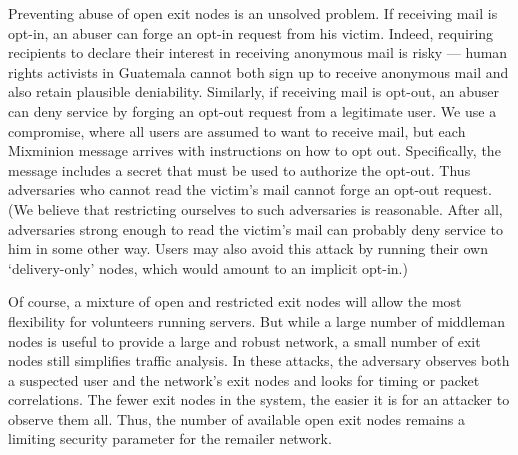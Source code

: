 \documentclass[final]{ieee}
\begin{document}
Preventing abuse of open exit nodes is an unsolved problem. If
receiving mail is opt-in, an abuser can forge an opt-in request from
his victim. Indeed, requiring recipients to declare their interest
in receiving anonymous mail is risky --- human rights activists in
Guatemala cannot both sign up to receive anonymous mail and also retain
plausible deniability. %
Similarly, if receiving mail is opt-out, an abuser can deny service
by forging an opt-out request from a legitimate user. We use a compromise,
where all users are assumed to want to receive mail, but each Mixminion
message arrives with instructions on how to opt out. 
Specifically, the
message includes a secret that must be used to authorize the opt-out. Thus
adversaries who cannot read the victim's mail cannot forge an opt-out
request.  (We believe that restricting ourselves to such adversaries is
reasonable.  After all, adversaries strong enough to read the victim's mail
can probably deny service to him in some other way.  Users may also avoid
this attack by running their own `delivery-only' nodes, which would amount to
an implicit opt-in.)


Of course, a mixture of open and restricted exit nodes will allow the
most flexibility for volunteers running servers. But while a large number
of middleman nodes is useful to provide a large and robust network, a
small number of exit nodes still simplifies traffic analysis.
In these attacks, the adversary observes both a suspected user and the
network's exit nodes and looks for timing or packet correlations.  The fewer
exit nodes in the system, the easier it is for an attacker to observe them
all.  Thus, the
number of available open exit nodes remains a limiting security parameter
for the remailer network.
\end{document}
